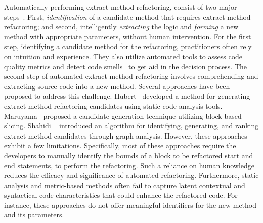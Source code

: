 Automatically performing extract method refactoring, consist of two major steps~\cite{kramer2010legacy}. 
First, \textit{identification} of a candidate method that requires extract method refactoring; 
and second, intelligently \textit{extracting} the logic and \textit{forming} a new method with appropriate parameters, without human intervention. 
For the first step,
\ie{} identifying a candidate method for the refactoring,
practitioners often rely on intuition and experience.
They also utilize automated tools to assess code quality metrics and detect code smells~\cite{Sharma2018} to get aid in the decision process.
The second step of automated extract method refactoring involves comprehending and extracting source code into a new method. Several approaches have been proposed to address this challenge. Hubert~\cite{hubert2019implementation} developed a method for generating extract method refactoring candidates using static code analysis tools. Maruyama~\cite{hubert2019implementation} proposed a candidate generation technique utilizing block-based slicing. Shahidi \etal{}~\cite{shahidi2022automated} introduced an algorithm for identifying, generating, and ranking extract method candidates through graph analysis. However, these approaches exhibit a few limitations. 
Specifically, most of these approaches require the developers to manually identify the bounds of a block to be refactored \ie{} start and end statements,
to perform the refactoring.
Such a reliance on human knowledge reduces the efficacy and significance of automated refactoring.
Furthermore, static analysis and metric-based methods often fail to capture latent contextual and syntactical code characteristics that could enhance the refactored code.
For instance, these approaches do not offer meaningful identifiers for the new method and its parameters.

